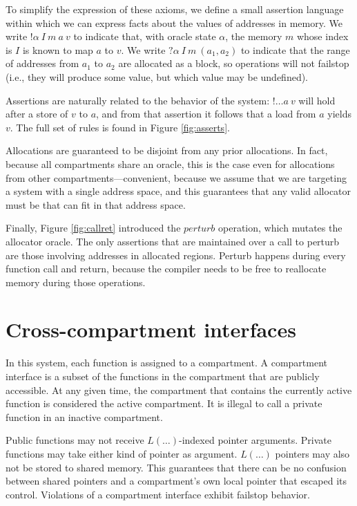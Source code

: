 \documentclass{article}
\begin{document}
To simplify the expression of these axioms, we define a small assertion language
within which we can express facts about the values of addresses in memory.
We write \(! \alpha ~ I ~ m ~ a ~ v\) to indicate that, with oracle state \(\alpha\),
the memory \(m\) whose index is \(I\) is known to map \(a\) to \(v\).
We write \(? \alpha ~ I ~ m ~ (a_1,a_2)\) to indicate that the range
of addresses from \(a_1\) to \(a_2\) are allocated as a block, so operations
will not failstop (i.e., they will produce some value, but which value may be
undefined).

Assertions are naturally related to the behavior of the system: \(! \ldots a ~ v\)
will hold after a store of \(v\) to \(a\), and from that assertion it follows that
a load from \(a\) yields \(v\). The full set of rules is found in
Figure \ref{fig:asserts}.

Allocations are guaranteed to be disjoint from any prior allocations.
In fact, because all compartments share an oracle, this is the case even for
allocations from other compartments---convenient, because we assume that we are
targeting a system with a single address space, and this guarantees that any valid
allocator must be that can fit in that address space.

Finally, Figure \ref{fig:callret} introduced the \(\mathit{perturb}\) operation,
which mutates the allocator oracle. The only assertions that are maintained over a
call to perturb are those involving addresses in allocated regions. Perturb happens
during every function call and return, because the compiler needs to be free to
reallocate memory during those operations.

\section{Cross-compartment interfaces}
\label{sec:interfaces}

In this system, each function is assigned to a compartment. A compartment interface
is a subset of the functions in the compartment that are publicly accessible.
At any given time, the compartment that contains the currently active function is
considered the active compartment. It is illegal to call a private function in an
inactive compartment.

Public functions may not receive \(L(\dots)\)-indexed pointer arguments.
Private functions may take either kind of pointer as argument. \(L(\dots)\) pointers
may also not be stored to shared memory. This guarantees that there can be no
confusion between shared pointers and a compartment's own local pointer that
escaped its control. Violations of a compartment interface exhibit failstop behavior.
\end{document}

